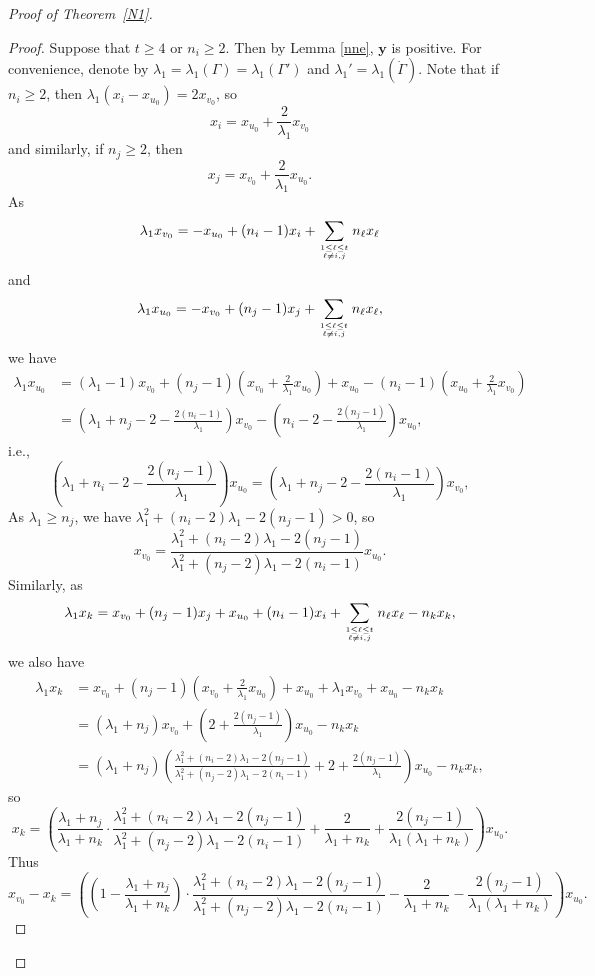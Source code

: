 \documentclass[10pt,a4paper]{amsart}
\numberwithin{equation}{section}
\begin{document}
\begin{proof}[Proof of Theorem~\ref{N1}]
\begin{proof}
Suppose that $t\ge 4$ or $n_i\ge 2$. Then by Lemma \ref{nne}, $\mathbf{y}$ is positive. 
For convenience, denote by $\lambda_1=\lambda_1(\Gamma)=\lambda_1(\Gamma')$ and $\lambda_1'=\lambda_1(\dot{\Gamma})$.  
Note that if $n_i\ge 2$, then $\lambda_1(x_i-x_{u_0})=2x_{v_0}$, so  
\[
x_i=x_{u_0}+\frac{2}{\lambda_1}x_{v_0}
\]
and  similarly, if $n_j\ge 2$, then  %
\[
x_j=x_{v_0}+\frac{2}{\lambda_1}x_{u_0}. 
\]
As
\[
\lambda_1x_{v_0}=-x_{u_0}+(n_i-1)x_i+\sum_{1\le \ell\le t\atop\ell\ne i, j}n_\ell x_\ell
\]
and
\[
\lambda_1x_{u_0} = -x_{v_0}+(n_j-1)x_j+\sum_{1\le \ell\le t\atop\ell\ne i, j}n_\ell x_\ell,
\]
we have
\begin{align*}
\lambda_1x_{u_0}
& = (\lambda_1-1)x_{v_0}+(n_j-1)\left(x_{v_0}+\frac{2}{\lambda_1}x_{u_0}\right)+x_{u_0}-(n_i-1)\left(x_{u_0}+\frac{2}{\lambda_1}x_{v_0}\right)\\
& = \left(\lambda_1+n_j-2-\frac{2(n_i-1)}{\lambda_1}\right)x_{v_0}-\left(n_i-2-\frac{2(n_j-1)}{\lambda_1}\right)x_{u_0}, 
\end{align*}
i.e.,
\[
\left(\lambda_1+n_i-2-\frac{2(n_j-1)}{\lambda_1}\right)x_{u_0}=\left(\lambda_1+n_j-2-\frac{2(n_i-1)}{\lambda_1}\right)x_{v_0}, 
\]
As $\lambda_1\ge n_j$, we have $\lambda_1^2+(n_i-2)\lambda_1-2(n_j-1)>0$, so
\[
x_{v_0}=\frac{\lambda_1^2+(n_i-2)\lambda_1-2(n_j-1)}{\lambda_1^2+(n_j-2)\lambda_1-2(n_i-1)}x_{u_0}. 
\]
Similarly, as
\[
\lambda_1x_k=x_{v_0}+(n_j-1)x_j+x_{u_0}+(n_i-1)x_i+\sum_{1\le \ell\le t\atop\ell\ne i, j}n_\ell x_\ell-n_kx_k,
\]
we also have
\begin{align*}
\lambda_1x_k
& =x_{v_0}+(n_j-1)\left(x_{v_0}+\frac{2}{\lambda_1}x_{u_0}\right)+x_{u_0}+\lambda_1x_{v_0}+x_{u_0}-n_kx_k\\
& =(\lambda_1+n_j)x_{v_0}+\left(2+\frac{2(n_j-1)}{\lambda_1}\right)x_{u_0}-n_kx_k\\
& =(\lambda_1+n_j)\left(\frac{\lambda_1^2+(n_i-2)\lambda_1-2(n_j-1)}{\lambda_1^2+(n_j-2)\lambda_1-2(n_i-1)}+2+\frac{2(n_j-1)}{\lambda_1}\right)x_{u_0}-n_kx_k, 
\end{align*}
so
\[
x_k=\left(\frac{\lambda_1+n_j}{\lambda_1+n_k}\cdot\frac{\lambda_1^2+(n_i-2)\lambda_1-2(n_j-1)}{\lambda_1^2+(n_j-2)\lambda_1-2(n_i-1)}+\frac{2}{\lambda_1+n_k}+\frac{2(n_j-1)}{\lambda_1(\lambda_1+n_k)}\right)x_{u_0}. 
\]
Thus 
\[
x_{v_0}-x_k=\left(\left(1-\frac{\lambda_1+n_j}{\lambda_1+n_k}\right)\cdot\frac{\lambda_1^2+(n_i-2)\lambda_1-2(n_j-1)}{\lambda_1^2+(n_j-2)\lambda_1-2(n_i-1)}-\frac{2}{\lambda_1+n_k}-\frac{2(n_j-1)}{\lambda_1(\lambda_1+n_k)}\right)x_{u_0}. 
\]
\end{proof}
\end{proof}
\end{document}
